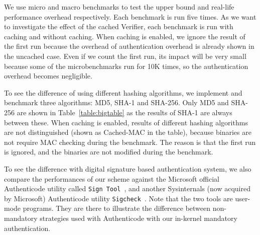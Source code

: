 We use micro and macro benchmarks to test the upper bound and
real-life performance overhead respectively.
Each benchmark is run five times.
As we want to investigate the effect of the cached Verifier,
each benchmark is run with caching and without caching.
When caching is enabled, we ignore the result of the first run because
the overhead of authentication overhead is already shown in the uncached case.
Even if we count the first run, its impact will be very small because
some of the microbenchmarks run for 10K times, so the authentication
overhead becomes negligible.

To see the difference of using different hashing algorithms, we implement
and benchmark three algorithms: MD5, SHA-1 and SHA-256.
Only MD5 and SHA-256 are shown in Table~\ref{table:bigtable} as
the results of SHA-1 are always between these.
When caching is enabled, results of different hashing algorithms are
not distinguished (shown as Cached-MAC in the table),
because binaries are not require MAC checking during the benchmark.
The reason is that the first run is ignored, and the binaries are not modified
during the benchmark.

To see the difference with digital signature based authentication system,
we also compare the performances of our scheme against the Microsoft official
Authenticode utility called {\tt Sign Tool}~\cite{signtool}, and another
Sysinternals (now acquired by Microsoft) Authenticode utility
{\tt Sigcheck}~\cite{sigcheck}.
Note that the two tools are user-mode programs.
They are there to illustrate the difference between non-mandatory strategies
used with Authenticode with our in-kernel mandatory authentication.


